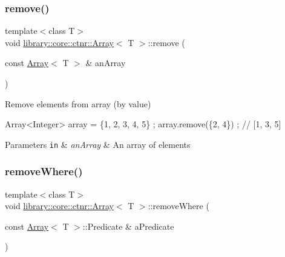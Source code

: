 \subsubsection{\texorpdfstring{remove()}{remove()}\hspace{0.1cm}{\footnotesize\ttfamily [2/2]}}
{\footnotesize\ttfamily template$<$class T$>$ \\
void \hyperlink{classlibrary_1_1core_1_1ctnr_1_1_array}{library\+::core\+::ctnr\+::\+Array}$<$ T $>$\+::remove (\begin{DoxyParamCaption}\item[{const \hyperlink{classlibrary_1_1core_1_1ctnr_1_1_array}{Array}$<$ T $>$ \&}]{an\+Array }\end{DoxyParamCaption})}



Remove elements from array (by value) 


\begin{DoxyCode}
Array<Integer> array = \{1, 2, 3, 4, 5\} ;
array.remove(\{2, 4\}) ; \textcolor{comment}{// [1, 3, 5]}
\end{DoxyCode}



\begin{DoxyParams}[1]{Parameters}
\mbox{\tt in}  & {\em an\+Array} & An array of elements \\
\hline
\end{DoxyParams}
\mbox{\label{classlibrary_1_1core_1_1ctnr_1_1_array_a322b1bfc3a93ea18bf68eb0cff69e6d3}} 
\subsubsection{\texorpdfstring{remove\+Where()}{removeWhere()}}
{\footnotesize\ttfamily template$<$class T$>$ \\
void \hyperlink{classlibrary_1_1core_1_1ctnr_1_1_array}{library\+::core\+::ctnr\+::\+Array}$<$ T $>$\+::remove\+Where (\begin{DoxyParamCaption}\item[{const \hyperlink{classlibrary_1_1core_1_1ctnr_1_1_array}{Array}$<$ T $>$\+::Predicate \&}]{a\+Predicate }\end{DoxyParamCaption})}



